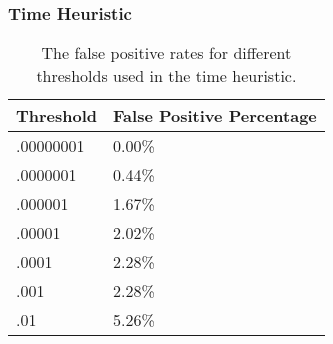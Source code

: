 \subsubsection{Time Heuristic}

\begin{table}[h]
\begin{center}
    \begin{tabular}{| l | l |}
    \hline
    Threshold & False Positive Percentage \\ \hline \hline
    .00000001 & 0.00\% \\ \hline
    .0000001 & 0.44\% \\ \hline
    .000001 & 1.67\% \\ \hline
    .00001 & 2.02\% \\ \hline
    .0001 & 2.28\% \\ \hline
    .001 & 2.28\% \\ \hline
    .01 & 5.26\% \\
    \hline
    \end{tabular}
\end{center}
\caption{The false positive rates for different thresholds used in the time heuristic.}
\label{tab:time}
\end{table}

